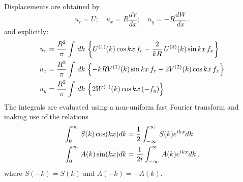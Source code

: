 \documentclass[12pt,a4paper]{article}
\begin{document}
%
Displacements are obtained by 
\begin{displaymath}
u_r = U;\quad u_x = R\frac{dV}{dx};\quad u_y = -R\frac{dW}{dx} \,.
\end{displaymath}
and explicitly:
\begin{align}
u_r & = \frac{R^2}{\pi} \int\,dk\,\left\{U^{(1)}(k) \cos kx\,f_r - \frac{2}{kR}\,U^{(2)}(k)\sin kx\,f_x\right\} \notag \\
u_x & = \frac{R^2}{\pi} \int\,dk\,\left\{-kR V^{(1)}(k)\sin kx\,f_r - 2V^{(2)}(k)\cos kx\,f_x\right\} \notag \\
u_y & = \frac{R^2}{\pi} \int\,dk\,\left\{2W^{(1)}(k) \cos kx\,(-f_y)\right\} \notag \\
\end{align}
%
The integrals are evaluated using a non-uniform fast Fourier transform and making use of the relations
\begin{align}
\int_0^\infty\,S(k)\cos(kx)dk & = \frac{1}{2}\int_{-\infty}^\infty\,S(k)e^{ikx}dk \notag \\
\int_0^\infty\,A(k)\sin(kx)dk & = \frac{1}{2i}\int_{-\infty}^\infty\,A(k)e^{ikx}dk \notag \,,
\end{align}
where $S(-k) = S(k)$ and $A(-k) = -A(k)$.
%
\end{document}
